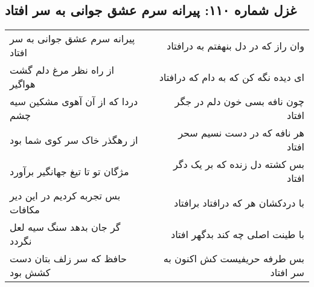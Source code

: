 \begin{center}
\section*{غزل شماره ۱۱۰: پیرانه سرم عشق جوانی به سر افتاد}
\label{sec:sh110}
\begin{longtable}{l p{0.5cm} r}
پیرانه سرم عشق جوانی به سر افتاد
&&
وان راز که در دل بنهفتم به درافتاد
\\
از راه نظر مرغ دلم گشت هواگیر
&&
ای دیده نگه کن که به دام که درافتاد
\\
دردا که از آن آهوی مشکین سیه چشم
&&
چون نافه بسی خون دلم در جگر افتاد
\\
از رهگذر خاک سر کوی شما بود
&&
هر نافه که در دست نسیم سحر افتاد
\\
مژگان تو تا تیغ جهانگیر برآورد
&&
بس کشته دل زنده که بر یک دگر افتاد
\\
بس تجربه کردیم در این دیر مکافات
&&
با دردکشان هر که درافتاد برافتاد
\\
گر جان بدهد سنگ سیه لعل نگردد
&&
با طینت اصلی چه کند بدگهر افتاد
\\
حافظ که سر زلف بتان دست کشش بود
&&
بس طرفه حریفیست کش اکنون به سر افتاد
\\
\end{longtable}
\end{center}

